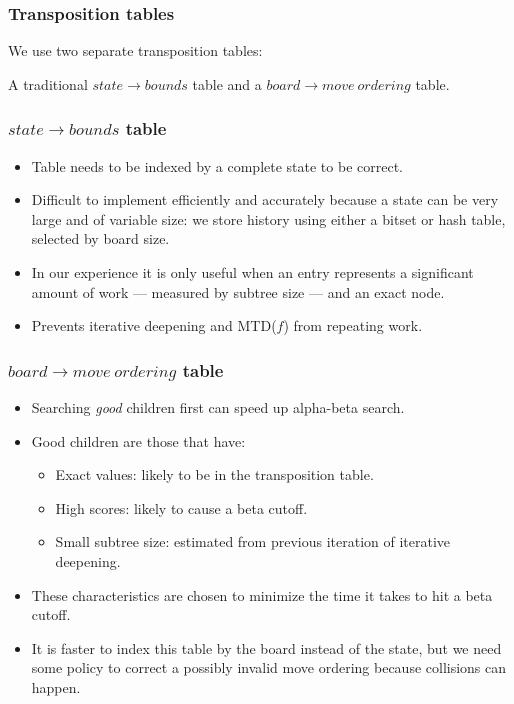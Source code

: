 \documentclass{beamer}
\begin{document}
    \begin{frame}
        \frametitle{Transposition tables}
        We use two separate transposition tables:

        A traditional $state \rightarrow bounds$ table and
            a $board \rightarrow move\ ordering$ table.
    \end{frame}

    \begin{frame}
        \frametitle{$state \rightarrow bounds$ table}
        \begin{itemize}
            \item Table needs to be indexed by a complete state to be correct.
            \item Difficult to implement efficiently and accurately because a state can be very
                large and of variable size: we store history using either a bitset or hash table, selected by
                board size.
            \item In our experience it is only useful when an entry represents a significant amount
                of work --- measured by subtree size --- and an exact node.
            \item Prevents iterative deepening and MTD($f$) from repeating work.
        \end{itemize}
    \end{frame}

    \begin{frame}
        \frametitle{$board \rightarrow move\ ordering$ table}
        \begin{itemize}
            \item Searching \textit{good} children first can speed up alpha-beta search.
            \item Good children are those that have:
                \begin{itemize}
                    \item Exact values: likely to be in the transposition table.
                    \item High scores: likely to cause a beta cutoff.
                    \item Small subtree size: estimated from previous iteration of iterative deepening.
                \end{itemize}
            \item These characteristics are chosen to minimize the time it takes to hit a beta cutoff.
            \item It is faster to index this table by the board instead of the state, but we need some policy
                to correct a possibly invalid move ordering because collisions can happen.
        \end{itemize}
    \end{frame}
\end{document}
